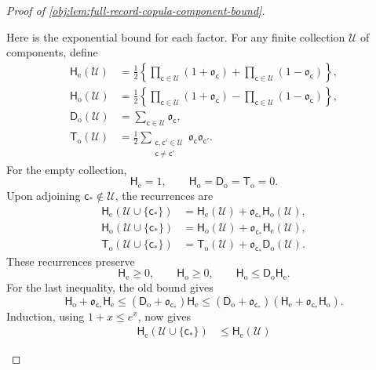 \begin{proof}[Proof of \cref{obj:lem:full-record-copula-component-bound}]
\begin{enumerate}
Here is the exponential bound for each factor. For any finite collection
\(\mathscr U\) of components, define
\[
\begin{aligned}
\mathsf H_{\mathrm e}(\mathscr U)
 &=\frac12\left\{
   \prod_{\mathsf c\in\mathscr U}(1+\mathfrak o_{\mathsf c})
   +\prod_{\mathsf c\in\mathscr U}(1-\mathfrak o_{\mathsf c})
   \right\},\\
\mathsf H_{\mathrm o}(\mathscr U)
 &=\frac12\left\{
   \prod_{\mathsf c\in\mathscr U}(1+\mathfrak o_{\mathsf c})
   -\prod_{\mathsf c\in\mathscr U}(1-\mathfrak o_{\mathsf c})
   \right\},\\
\mathsf D_{\mathrm o}(\mathscr U)
 &=\sum_{\mathsf c\in\mathscr U}\mathfrak o_{\mathsf c},\\
\mathsf T_{\mathrm o}(\mathscr U)
 &=\frac12\sum_{\substack{\mathsf c,\mathsf c'\in\mathscr U\\
                         \mathsf c\ne\mathsf c'}}
      \mathfrak o_{\mathsf c}\mathfrak o_{\mathsf c'}.
\end{aligned}
\]
For the empty collection,
\[
\mathsf H_{\mathrm e}=1,\qquad
\mathsf H_{\mathrm o}=\mathsf D_{\mathrm o}
 =\mathsf T_{\mathrm o}=0.
\]
Upon adjoining \(\mathsf c_*\notin\mathscr U\), the recurrences are
\[
\begin{aligned}
\mathsf H_{\mathrm e}(\mathscr U\cup\{\mathsf c_*\})
 &=\mathsf H_{\mathrm e}(\mathscr U)
   +\mathfrak o_{\mathsf c_*}\mathsf H_{\mathrm o}(\mathscr U),\\
\mathsf H_{\mathrm o}(\mathscr U\cup\{\mathsf c_*\})
 &=\mathsf H_{\mathrm o}(\mathscr U)
   +\mathfrak o_{\mathsf c_*}\mathsf H_{\mathrm e}(\mathscr U),\\
\mathsf T_{\mathrm o}(\mathscr U\cup\{\mathsf c_*\})
 &=\mathsf T_{\mathrm o}(\mathscr U)
   +\mathfrak o_{\mathsf c_*}\mathsf D_{\mathrm o}(\mathscr U).
\end{aligned}
\]
These recurrences preserve
\[
\mathsf H_{\mathrm e}\ge0,\qquad
\mathsf H_{\mathrm o}\ge0,\qquad
\mathsf H_{\mathrm o}
 \le\mathsf D_{\mathrm o}\mathsf H_{\mathrm e}.
\]
For the last inequality, the old bound gives
\[
\mathsf H_{\mathrm o}
 +\mathfrak o_{\mathsf c_*}\mathsf H_{\mathrm e}
 \le
 (\mathsf D_{\mathrm o}+\mathfrak o_{\mathsf c_*})
 \mathsf H_{\mathrm e}
 \le
 (\mathsf D_{\mathrm o}+\mathfrak o_{\mathsf c_*})
 (\mathsf H_{\mathrm e}
   +\mathfrak o_{\mathsf c_*}\mathsf H_{\mathrm o}).
\]
Induction, using \(1+x\le e^x\), now gives
\[
\begin{aligned}
\mathsf H_{\mathrm e}(\mathscr U\cup\{\mathsf c_*\})
 &\le
 \mathsf H_{\mathrm e}(\mathscr U)

\end{aligned}\]
\end{enumerate}
\end{proof}
